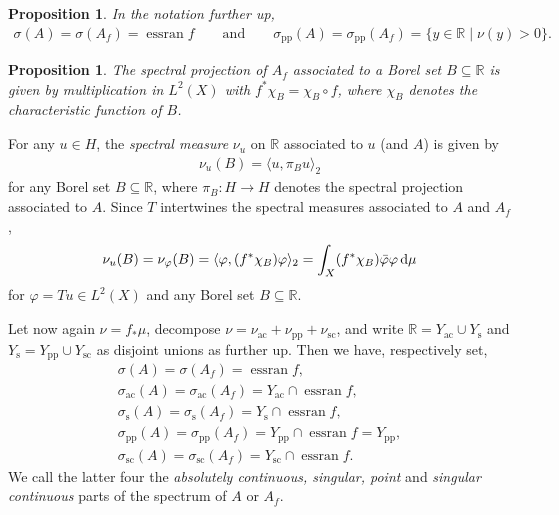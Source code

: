 \documentclass[10pt,a4paper]{amsart}
\numberwithin{equation}{section}
\newtheorem{Proposition}[Theorem]{Proposition}
\DeclareMathOperator{\essran}{essran}
\def\p{\mathrm{pp}}
\def\ac{\mathrm{ac}}
\def\sc{\mathrm{sc}}
\def\s{\mathrm s}
\def\R{\mathbb R}
\def\vf{\varphi}
\begin{document}
\begin{Proposition}\label{aaf}
In the notation further up,
\begin{align*}
	\sigma(A) = \sigma(A_f) = \essran f
	\qquad\text{and}\qquad
	\sigma_{\p}(A)=\sigma_{\p}(A_f)=\{y\in\R\mid\nu(y)>0\}.
\end{align*}
\end{Proposition}

\begin{Proposition}%
The spectral projection of $A_f$ associated to a Borel set $B\subseteq\R$
is given by multiplication in $L^2(X)$ with $f^*\chi_B=\chi_B\circ f$,
where $\chi_B$ denotes the characteristic function of $B$.
\end{Proposition}

For any $u\in H$,
the \emph{spectral measure} $\nu_u$ on $\R$ associated to $u$ (and $A$) is given by
\begin{align*}%
	\nu_u(B) = \langle u,\pi_Bu\rangle_2
\end{align*}
for any Borel set $B\subseteq\R$,
where $\pi_B\colon H\to H$ denotes the spectral projection associated to $A$.
Since $T$ intertwines the spectral measures associated to $A$ and $A_f$,
\begin{align*}%
	\nu_u(B) = \nu_\vf(B) = \langle\vf,(f^*\chi_B)\vf\rangle_2 = \int_X (f^*\chi_B)\bar\vf\vf\, {\rm d}\mu
\end{align*}
for $\vf=Tu\in L^2(X)$ and any Borel set $B\subseteq\R$.

Let now again $\nu=f_*\mu$, decompose $\nu=\nu_{\ac}+\nu_{\p}+\nu_{\sc}$,
and write $\R=Y_{\ac}\cup Y_{\s}$ and $Y_{\s}=Y_{\p}\cup Y_{\sc}$ as disjoint unions as further up.
Then we have, respectively set,
\begin{gather*}%
	\sigma(A) = \sigma(A_f) = \essran f,\\
	\sigma_{\ac}(A) =\sigma_{\ac}(A_f) = Y_{\ac}\cap\essran f,\\
	\sigma_{\s}(A) = \sigma_{\s}(A_f) = Y_{\s}\cap\essran f, \\
	\sigma_{\p}(A) = \sigma_{\p}(A_f) = Y_{\p}\cap\essran f = Y_{\p}, \\
	\sigma_{\sc}(A) = \sigma_{\sc}(A_f) = Y_{\sc}\cap\essran f.
\end{gather*}
We call the latter four the \emph{absolutely continuous, singular, point} and \emph{singular continuous}
parts of the spectrum of $A$ or $A_f$.
\end{document}
